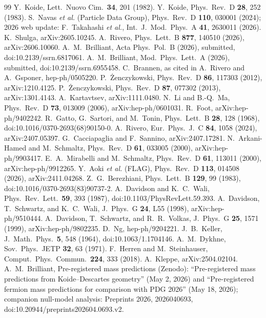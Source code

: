 \documentclass[11pt]{article}
\begin{document}
\begin{thebibliography}{99}
 Y.~Koide, Lett.\ Nuovo Cim.\ \textbf{34}, 201 (1982).
 Y.~Koide, Phys.\ Rev.\ D \textbf{28}, 252 (1983).
 S.~Navas \emph{et al.} (Particle Data Group), Phys.\ Rev.\ D \textbf{110}, 030001 (2024); 2026 web update: F.~Takahashi \emph{et al.}, Int.\ J.\ Mod.\ Phys.\ A \textbf{41}, 2630011 (2026).
 K.~Shulga, arXiv:2605.10245.
 A.~Rivero, Phys.\ Lett.\ B \textbf{877}, 140510 (2026), arXiv:2606.10060.
 A.~M.~Brilliant, Acta Phys.\ Pol.\ B (2026), submitted, doi:10.2139/ssrn.6817061. %
 A.~M.~Brilliant, Mod.\ Phys.\ Lett.\ A (2026), submitted, doi:10.2139/ssrn.6955458. %
 C.~Brannen, as cited in A.~Rivero and A.~Gsponer, hep-ph/0505220.
 P.~\.{Z}enczykowski, Phys.\ Rev.\ D \textbf{86}, 117303 (2012), arXiv:1210.4125.
 P.~\.{Z}enczykowski, Phys.\ Rev.\ D \textbf{87}, 077302 (2013), arXiv:1301.4143.
 A.~Kartavtsev, arXiv:1111.0480.
 N.~Li and B.-Q.~Ma, Phys.\ Rev.\ D \textbf{73}, 013009 (2006), arXiv:hep-ph/0601031.
 R.~Foot, arXiv:hep-ph/9402242.
 R.~Gatto, G.~Sartori, and M.~Tonin, Phys.\ Lett.\ B \textbf{28}, 128 (1968), doi:10.1016/0370-2693(68)90150-0.
 A.~Rivero, Eur.\ Phys.\ J.\ C \textbf{84}, 1058 (2024), arXiv:2407.05397.
 G.~Cacciapaglia and F.~Sannino, arXiv:2407.17281.
 N.~Arkani-Hamed and M.~Schmaltz, Phys.\ Rev.\ D \textbf{61}, 033005 (2000), arXiv:hep-ph/9903417.
 E.~A.~Mirabelli and M.~Schmaltz, Phys.\ Rev.\ D \textbf{61}, 113011 (2000), arXiv:hep-ph/9912265.
 Y.~Aoki \emph{et al.} (FLAG), Phys.\ Rev.\ D \textbf{113}, 014508 (2026), arXiv:2411.04268.
 Z.~G.~Berezhiani, Phys.\ Lett.\ B \textbf{129}, 99 (1983), doi:10.1016/0370-2693(83)90737-2.
 A.~Davidson and K.~C.~Wali, Phys.\ Rev.\ Lett.\ \textbf{59}, 393 (1987), doi:10.1103/PhysRevLett.59.393.
 A.~Davidson, T.~Schwartz, and K.~C.~Wali, J.\ Phys.\ G \textbf{24}, L55 (1998), arXiv:hep-ph/9510444.
 A.~Davidson, T.~Schwartz, and R.~R.~Volkas, J.\ Phys.\ G \textbf{25}, 1571 (1999), arXiv:hep-ph/9802235.
 D.~Ng, hep-ph/9204221.
 J.~B.~Keller, J.\ Math.\ Phys.\ \textbf{5}, 548 (1964), doi:10.1063/1.1704146.
 A.~M.~Dykhne, Sov.\ Phys.\ JETP \textbf{32}, 63 (1971).
 F.~Herren and M.~Steinhauser, Comput.\ Phys.\ Commun.\ \textbf{224}, 333 (2018).
 A.~Kleppe, arXiv:2504.02104.
 A.~M.~Brilliant, Pre-registered mass predictions (Zenodo): ``Pre-registered mass predictions from Koide--Descartes geometry'' (May 2, 2026) and ``Pre-registered fermion mass predictions for comparison with PDG 2026'' (May 18, 2026); companion null-model analysis: Preprints 2026, 2026040693, doi:10.20944/preprints202604.0693.v2. %
\end{thebibliography}
\end{document}
